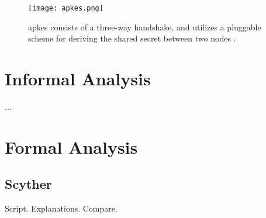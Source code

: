 \begin{figure}[h]
	\centering
	\texttt{[image: apkes.png]}
	\caption{\gls{apkes} consists of a three-way handshake, and utilizes a pluggable scheme for deriving the shared secret between two nodes \cite{krentz20136lowpan}.}
	\label{fig:apkes}
\end{figure}

\section{Informal Analysis}

...

\section{Formal Analysis}

\subsection{Scyther}


Script. Explanations. Compare.










